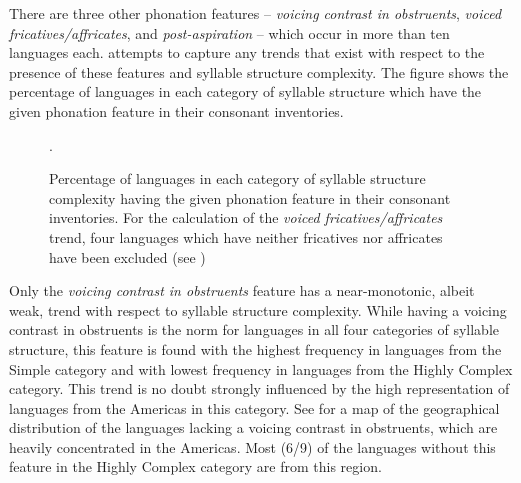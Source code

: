   There are three other phonation features -- \textit{voicing contrast in obstruents}, \textit{voiced fricatives/affricates}, and \textit{post-aspiration} -- which occur in more than ten languages each.  attempts to capture any trends that exist with respect to the presence of these features and syllable structure complexity. The figure shows the percentage of languages in each category of syllable structure which have the given phonation feature in their consonant inventories.

\begin{figure}
\caption{\label{fig:4.5}Percentage of languages in each category of syllable structure complexity having the given phonation feature in their consonant inventories. For the calculation of the \textit{voiced fricatives/affricates} trend, four languages which have neither fricatives nor affricates have been excluded (see )}.
\end{figure}

  Only the \textit{voicing contrast in obstruents} feature has a near-monotonic, albeit weak, trend with respect to syllable structure complexity. While having a voicing contrast in obstruents is the norm for languages in all four categories of syllable structure, this feature is found with the highest frequency in languages from the Simple category and with lowest frequency in languages from the Highly Complex category. This trend is no doubt strongly influenced by the high representation of languages from the Americas in this category. See  for a map of the geographical distribution of the languages lacking a voicing contrast in obstruents, which are heavily concentrated in the Americas. Most (6/9) of the languages without this feature in the Highly Complex category are from this region.

